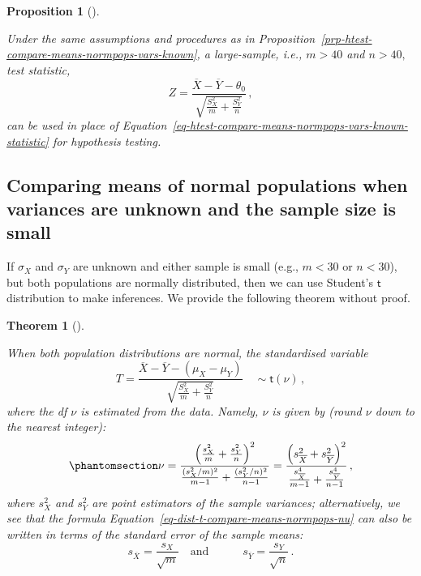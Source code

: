 \documentclass[
  a4paper,
  DIV=11,
  numbers=noendperiod,
  oneside]{scrreprt}
\theoremstyle{definition}
\theoremstyle{definition}
\theoremstyle{plain}
\newtheorem{proposition}{Proposition}[chapter]
\theoremstyle{plain}
\newtheorem{theorem}{Theorem}[chapter]
\theoremstyle{definition}
\theoremstyle{remark}
\begin{document}
\begin{proposition}[]\protect\hypertarget{prp-htest-compare-means-large-samples}{}\label{prp-htest-compare-means-large-samples}

Under the same assumptions and procedures as in
Proposition~\ref{prp-htest-compare-means-normpops-vars-known}, a
large-sample, i.e., \(m > 40\) and \(n > 40,\) test statistic, \[
 Z = \frac{\overline{X} - \overline{Y} - \theta_0}{\sqrt{\frac{S_{X}^2}{m} + \frac{S_{Y}^2}{n}}}\,,
\] can be used in place of
Equation~\ref{eq-htest-compare-means-normpops-vars-known-statistic} for
hypothesis testing.

\end{proposition}

\subsection{Comparing means of normal populations when variances are
unknown and the sample size is
small}\label{sec-compare-means-normpops-vars-unknown}

If \(\sigma_X\) and \(\sigma_Y\) are unknown and either sample is small
(e.g., \(m < 30\) or \(n <30\)), but both populations are normally
distributed, then we can use Student's \(\mathsf{t}\) distribution to
make inferences. We provide the following theorem without proof.

\begin{theorem}[]\protect\hypertarget{thm-dist-t-compare-means-normpops}{}\label{thm-dist-t-compare-means-normpops}

When both population distributions are normal, the standardised variable
\[
T = \frac{\overline{X}-\overline{Y} - (\mu_X - \mu_Y)}{\sqrt{\frac{S_X^2}{m} + \frac{S_Y^2}{n}}} 
\quad \sim \mathsf{t}(\nu)\,,
\] where the df \(\nu\) is estimated from the data. Namely, \(\nu\) is
given by (round \(\nu\) down to the nearest integer):
\begin{equation}\phantomsection\label{eq-dist-t-compare-means-normpops-nu}{
 \nu = \frac{ \left( \frac{s_X^2}{m} + \frac{s_Y^2}{n} \right)^2}{\frac{(s_X^2 / m)^2}{m-1} + \frac{(s_Y^2/n)^2}{n-1}} 
 = \frac{ \left( s_{\overline{X}}^2 + s_{\overline{Y}}^2 \right)^2}{\frac{s_{\overline{X}}^4}{m-1} + \frac{s_{\overline{Y}}^4}{n-1}}\,,
}\end{equation} where \(s_X^2\) and \(s_Y^2\) are point estimators of
the sample variances; alternatively, we see that the formula
Equation~\ref{eq-dist-t-compare-means-normpops-nu} can also be written
in terms of the standard error of the sample means: \[
 s_{\overline{X}} = \frac{s_X}{\sqrt{m}} 
 \quad \text{and} \quad \qquad 
 s_{\overline{Y}} = \frac{s_Y}{\sqrt{n}} \,.
\]

\end{theorem}
\end{document}
